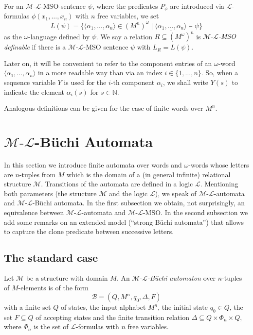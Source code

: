 \documentclass[copyright,creativecommons]{eptcs}
\theoremstyle{plain}
\theoremstyle{nonumberplain}
\newcommand{\m}{\ensuremath{\mathcal{M}}}
\newcommand{\el}{\ensuremath{\mathcal{L}}}
\newcommand{\ml}{\ensuremath{\m\textrm{-}\el}}
\begin{document}
For an \ml-MSO-sentence $\psi$, where the predicates $P_\phi$ are introduced via 
$\el$-formulas $\phi(x_1, \ldots, x_n)$ with $n$ free variables, we set 
$$L(\psi) = \{\langle \alpha_1, \ldots, \alpha_n \rangle  \in (M^n)^\omega 
\mid \underline{\langle \alpha_1, \ldots, \alpha_n \rangle} \models \psi\}$$ 
as the $\omega$-language defined by $\psi$. 
We say a relation $R \subseteq (M^\omega)^n$ is \emph{\ml-MSO definable} 
if there is a \ml-MSO sentence $\psi$ with $L_R = L(\psi)$.

Later on, it will be convenient to refer to the component entries of an $\omega$-word $\langle \alpha_1, \ldots, \alpha_n \rangle$ in a more readable way than via an index $i \in \{1,\ldots,n\}$. So, when a sequence variable $Y$ is used for the $i$-th component $\alpha_i$, we shall write $Y(s)$ to indicate the element $\alpha_i(s)$ for $s \in \mathbb{N}$.

Analogous definitions can be given for the case of finite words over $M^n$. 



\section{\ml-B{\"u}chi Automata}\label{sec_mlaut}




In this section we introduce finite automata over words and $\omega$-words 
whose letters are $n$-tuples from $M$ which is the  
domain of a (in general infinite) relational structure $\m$. 
Transitions of the automata are defined in 
a logic $\el$. Mentioning both parameters (the structure $\m$ and the logic $\el$), 
we speak of \ml-automata and \ml-B\"uchi automata. In the first subsection we obtain, 
not surprisingly, an 
equivalence between \ml-automata and \ml-MSO. In the second subsection we add some 
remarks  on an extended model (``strong B\"uchi automata'') that allows to capture 
the clone predicate between successive letters. 



\subsection{The standard case}



Let $\m$ be a structure with domain $M$. 
An \emph{\ml-B{\"u}chi automaton} over $n$-tuples of $M$-elements is of the form 
$$\mathcal{B} = (Q, M^n, q_0, \Delta, F)$$ 
with a finite set $Q$ of states, the input alphabet $M^n$,  
the initial state $q_0 \in Q$, the set $F \subseteq Q$ of accepting states and 
the finite transition relation 
$\Delta \subseteq Q \times \Phi_n \times Q$, where $\Phi_n$ is the set of $\el$-formulas with $n$ free variables. 
\end{document}
